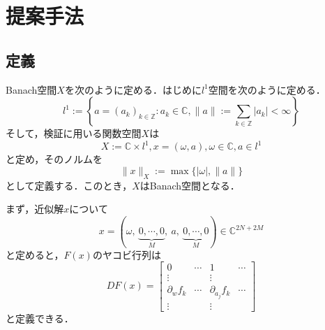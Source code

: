 
\chapter{提案手法}
\label{cpt:提案手法}

\section{定義}

\begin{dfn}[許容重みなしBanach空間$X$]
  \label{dfn:Banach-l1}
  Banach空間$X$を次のように定める．はじめに$l^1$空間を次のように定める．
  \begin{equation}
    l^1 := \left\{ a=(a_k)_{k\in \mathbb{Z}} : a_k \in \mathbb{C}, \|a\| := \sum_{k \in \mathbb{Z}} |a_k| < \infty \right\}
  \end{equation}
  そして，検証に用いる関数空間$X$は
  \begin{equation}
    X:= \mathbb{C} \times l^1, x = (\omega, a), \omega \in \mathbb{C}, a \in l^1
  \end{equation}
  と定め，そのノルムを
  \begin{equation}
    \| x \|_X := \max \{ |\omega| , \|a\| \}
  \end{equation}
  として定義する．このとき，$X$はBanach空間となる．
\end{dfn}

\begin{dfn}[拡張したヤコビ行列$DF(x)$]
  \label{dfn:拡張したヤコビ行列}
  まず，近似解$x$について
  \begin{equation}
    x = (\omega,\ \underbrace{0,\cdots,0}_{M},\ a,\ \underbrace{0,\cdots,0}_{M}) \in \mathbb{C}^{2N+2M}
  \end{equation}
  と定めると，$F(x)$のヤコビ行列は
  \begin{equation}
    DF(x) = \left[
      \begin{array}{c|ccc}
        0 & \cdots & 1 & \cdots \\ \hline
        \vdots & & \vdots &  \\
        \partial_w f_k & \cdots & \partial_{a_j}f_k & \cdots \\
        \vdots & & \vdots &
      \end{array}
    \right] %
  \end{equation}
  と定義できる．
\end{dfn}

